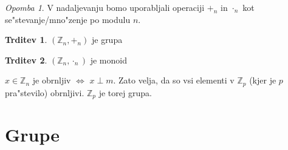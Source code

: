 \documentclass{article}
\theoremstyle{definition}
\newtheorem{claim}{Trditev}[section]
\theoremstyle{remark}
\newtheorem*{rem}{Opomba}
\newcommand{\Z}{\mathbb{Z}}
\begin{document}
	\begin{rem}
		V nadaljevanju bomo uporabljali operaciji $+_{n}$ in $\cdot_{n}$ kot se"stevanje/mno"zenje po modulu $n$.
	\end{rem}
	
	\begin{claim}
		$(\Z_n, +_n)$ je grupa
	\end{claim}
	\begin{claim}
		$(\Z_n, \cdot_n)$ je monoid
	\end{claim}
	$x \in \Z_n$ je obrnljiv $\iff$ $x \perp m$. Zato velja, da so vsi elementi v $\Z_p$ (kjer je $p$ pra"stevilo) obrnljivi. $\Z_p$ je torej grupa.
	
	\section{Grupe}
	
\end{document}
